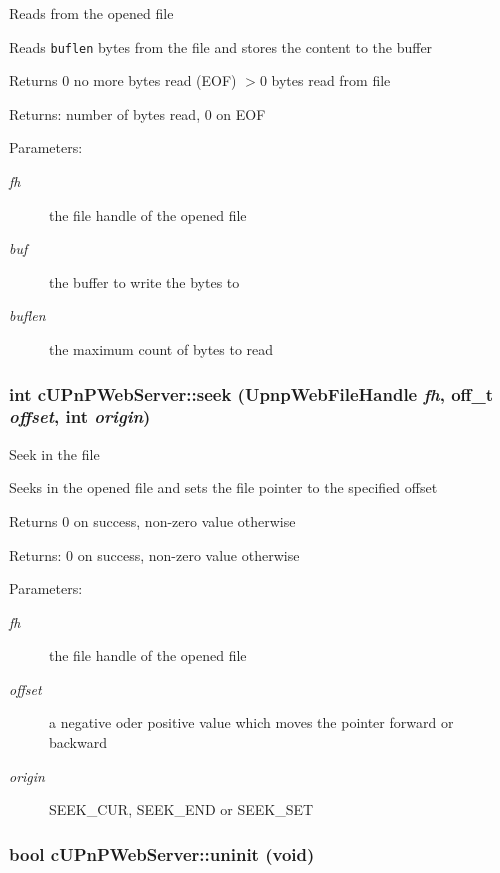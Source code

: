 Reads from the opened file

Reads {\tt buflen} bytes from the file and stores the content to the buffer

Returns 0 no more bytes read (EOF) $>$0 bytes read from file

\begin{Desc}
\item[Returns:]number of bytes read, 0 on EOF \end{Desc}
\begin{Desc}
\item[Parameters:]
\begin{description}
\item[{\em fh}]the file handle of the opened file \item[{\em buf}]the buffer to write the bytes to \item[{\em buflen}]the maximum count of bytes to read \end{description}
\end{Desc}
\hypertarget{classcUPnPWebServer_2d1ee3a89ea42cb9fd0669937061695f}{
\subsubsection[{seek}]{\setlength{\rightskip}{0pt plus 5cm}int cUPnPWebServer::seek (UpnpWebFileHandle {\em fh}, \/  off\_\-t {\em offset}, \/  int {\em origin})}}
\label{classcUPnPWebServer_2d1ee3a89ea42cb9fd0669937061695f}


Seek in the file

Seeks in the opened file and sets the file pointer to the specified offset

Returns 0 on success, non-zero value otherwise

\begin{Desc}
\item[Returns:]0 on success, non-zero value otherwise \end{Desc}
\begin{Desc}
\item[Parameters:]
\begin{description}
\item[{\em fh}]the file handle of the opened file \item[{\em offset}]a negative oder positive value which moves the pointer forward or backward \item[{\em origin}]SEEK\_\-CUR, SEEK\_\-END or SEEK\_\-SET \end{description}
\end{Desc}
\hypertarget{classcUPnPWebServer_cd20b60b929abfb205ec438127caed49}{
\subsubsection[{uninit}]{\setlength{\rightskip}{0pt plus 5cm}bool cUPnPWebServer::uninit (void)}}
\label{classcUPnPWebServer_cd20b60b929abfb205ec438127caed49}


